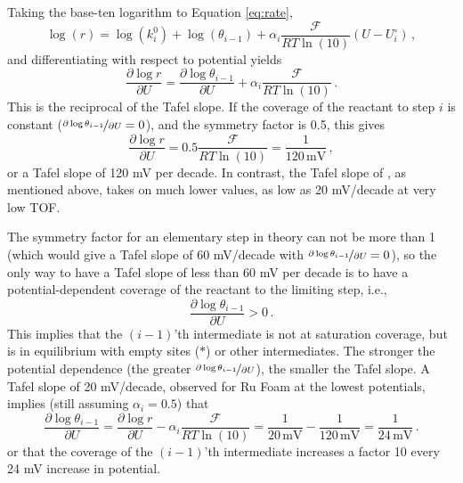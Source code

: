 Taking the base-ten logarithm to Equation \ref{eq:rate}, 
\begin{equation}
\log(r) = \log(k^0_i) + \log(\theta_{i-1}) + \alpha_i\frac{\mathcal{F}}{RT\ln(10)}(U-U^\circ_i)\,,
\end{equation}
and differentiating with respect to potential yields
\begin{equation}
\frac{\partial \log{r}}{\partial U} = \frac{\partial \log{\theta_{i-1}}}{\partial U} + \alpha_i\frac{\mathcal{F}}{RT\ln(10)}\,.
\end{equation}
This is the reciprocal of the Tafel slope. If the coverage of the reactant to step $i$ is constant ($\nicefrac{\partial \log{\theta_{i-1}}}{\partial U} = 0$), and the symmetry factor is 0.5, this gives 
\begin{equation}
\frac{\partial \log{r}}{\partial U} = 0.5\frac{\mathcal{F}}{RT\ln(10)} = \frac{1}{120\,\text{mV}}\,,
\end{equation}
or a Tafel slope of 120 mV per decade. In contrast, the Tafel slope of , as mentioned above, takes on much lower values, as low as 20 mV/decade at very low TOF.

The symmetry factor for an elementary step in theory can not be more than 1 (which would give a Tafel slope of 60 mV/decade with $\nicefrac{\partial \log{\theta_{i-1}}}{\partial U} = 0$), so the only way to have a Tafel slope of less than 60 mV per decade is to have a potential-dependent coverage of the reactant to the limiting step, i.e., 
\begin{equation}
\frac{\partial \log{\theta_{i-1}}}{\partial U} > 0\,.
\end{equation}
This implies that the $(i-1)$'th intermediate is not at saturation coverage, but is in equilibrium with empty sites ($*$) or other intermediates. The stronger the potential dependence (the greater $\nicefrac{\partial \log{\theta_{i-1}}}{\partial U}$), the smaller the Tafel slope. A Tafel slope of 20 mV/decade, observed for Ru Foam at the lowest potentials, implies (still assuming $\alpha_i=0.5$) that
\begin{equation}
\frac{\partial \log{\theta_{i-1}}}{\partial U} = \frac{\partial \log{r}}{\partial U} - \alpha_i\frac{\mathcal{F}}{RT\ln(10)} =  \frac{1}{20\,\text{mV}} - \frac{1}{120\,\text{mV}} = \frac{1}{24\,\text{mV}}\,.
\end{equation}
or that the coverage of the $(i-1)$'th intermediate increases a factor 10 every 24 mV increase in potential.


